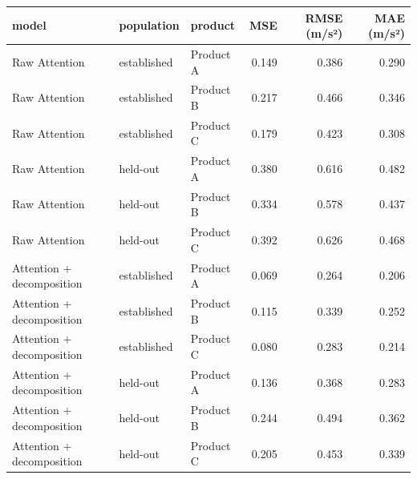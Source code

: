 \begin{tabular}{lllrrr}
\toprule
model & population & product & MSE & RMSE (m/s²) & MAE (m/s²) \\
\midrule
Raw Attention & established & Product A & 0.149 & 0.386 & 0.290 \\
Raw Attention & established & Product B & 0.217 & 0.466 & 0.346 \\
Raw Attention & established & Product C & 0.179 & 0.423 & 0.308 \\
Raw Attention & held-out & Product A & 0.380 & 0.616 & 0.482 \\
Raw Attention & held-out & Product B & 0.334 & 0.578 & 0.437 \\
Raw Attention & held-out & Product C & 0.392 & 0.626 & 0.468 \\
Attention + decomposition & established & Product A & 0.069 & 0.264 & 0.206 \\
Attention + decomposition & established & Product B & 0.115 & 0.339 & 0.252 \\
Attention + decomposition & established & Product C & 0.080 & 0.283 & 0.214 \\
Attention + decomposition & held-out & Product A & 0.136 & 0.368 & 0.283 \\
Attention + decomposition & held-out & Product B & 0.244 & 0.494 & 0.362 \\
Attention + decomposition & held-out & Product C & 0.205 & 0.453 & 0.339 \\
\bottomrule
\end{tabular}
